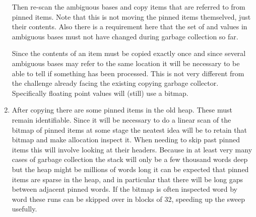 \begin{enumerate}
Then
re-scan the ambiguous bases and copy items that are referred to from
pinned items. Note that this is not moving the
pinned items themselved, just their contents. Also there is
a requirement here that the set of and values in ambiguous bases must
not have changed during garbage collection so far.

Since the contents of an item must be copied exactly once
and since several ambiguous bases may refer to the same location it will
be necessary to be able to tell if something has been processed. This is
not very different from the challenge already facing the existing copying
garbage collector. Specifically floating point values will (still) use
a bitmap.

\item After copying there are some pinned items in the old heap. These
must remain identifiable. Since it will be necessary to do a linear scan
of the bitmap of pinned items at some stage the neatest idea will be
to retain that bitmap and make allocation inspect it. When needing to
skip past pinned items this will involve looking at their headers. Because
in at least very many cases of garbage collection the stack will only
be a few thousand words deep but the heap might be millions of words
long it can be expected that pinned items are sparse in the heap, and
in particular that there will be long gaps between adjacent pinned
words. If the bitmap is often inspected word by word these runs can be
skipped over in blocks of 32, speeding up the sweep usefully.


\end{enumerate}


